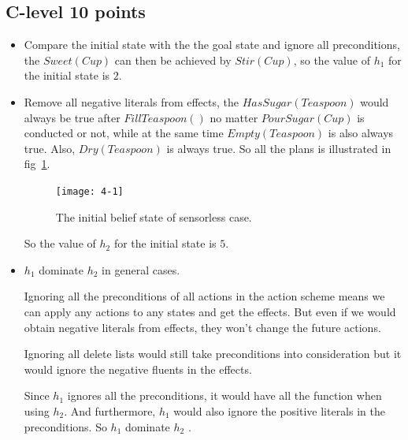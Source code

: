 \documentclass[11pt,a4paper]{article}
\begin{document}
\subsection{C-level 10 points}
\begin{itemize}
	\item Compare the initial state with the the goal state and ignore all preconditions,  the $Sweet(Cup)$ can then be achieved by $Stir(Cup)$, so the value of $h_{1}$ for the initial state is $2$.
	\item Remove all negative literals from effects, the $HasSugar(Teaspoon)$ would always be true after $FillTeaspoon()$ no matter $PourSugar(Cup)$ is conducted or not, while at the same time $Empty(Teaspoon)$ is also always true. Also, $Dry(Teaspoon)$ is always true. So all the plans is illustrated in fig~\ref{fig:4-1}.
	\begin{figure}[!htbp]
		\footnotesize
		\centering
		\texttt{[image: 4-1]}
		\caption{The initial belief state of sensorless case.}
		\label{fig:4-1}
	\end{figure}
	\par So the value of $h_{2}$ for the initial state is $5$.
	
	\item $h_{1}$ dominate $h_{2}$ in general cases. 
	\par Ignoring all the preconditions of all actions in the action scheme means we can apply any actions to any states and get the effects. But even if we would obtain negative literals from effects, they won't change the future actions.
	\par Ignoring all delete lists would still take preconditions into consideration but it would ignore the negative fluents in the effects.
	\par Since $h_{1}$ ignores all the preconditions, it would have all the function when using $h_{2}$. And furthermore, $h_{1}$ would also ignore the positive literals in the preconditions. So $h_{1}$ dominate $h_{2}$ .
	
\end{itemize}
\end{document}
